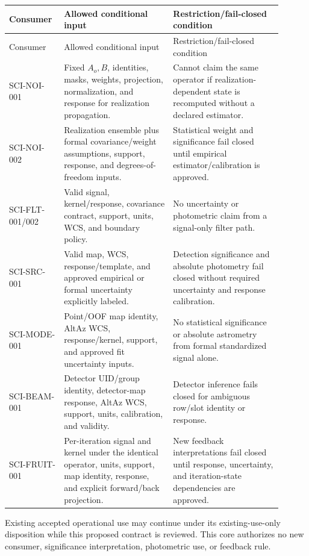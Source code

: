 \documentclass[11pt]{article}
\begin{document}
\begin{longtable}{L{0.16\linewidth}L{0.37\linewidth}L{0.37\linewidth}}
\toprule
Consumer & Allowed conditional input & Restriction/fail-closed condition\\
\midrule
\endfirsthead
\toprule
Consumer & Allowed conditional input & Restriction/fail-closed condition\\
\midrule
\endhead
SCI-NOI-001 & Fixed \(A_o,B\), identities, masks, weights, projection,
normalization, and response for realization propagation. & Cannot claim the
same operator if realization-dependent state is recomputed without a declared
estimator.\\
SCI-NOI-002 & Realization ensemble plus formal covariance/weight assumptions,
support, response, and degrees-of-freedom inputs. & Statistical weight and
significance fail closed until empirical estimator/calibration is approved.\\
SCI-FLT-001/002 & Valid signal, kernel/response, covariance contract, support,
units, WCS, and boundary policy. & No uncertainty or photometric claim from a
signal-only filter path.\\
SCI-SRC-001 & Valid map, WCS, response/template, and approved empirical or
formal uncertainty explicitly labeled. & Detection significance and absolute
photometry fail closed without required uncertainty and response calibration.\\
SCI-MODE-001 & Point/OOF map identity, AltAz WCS, response/kernel, support, and
approved fit uncertainty inputs. & No statistical significance or absolute
astrometry from formal standardized signal alone.\\
SCI-BEAM-001 & Detector UID/group identity, detector-map response, AltAz WCS,
support, units, calibration, and validity. & Detector inference fails closed
for ambiguous row/slot identity or response.\\
SCI-FRUIT-001 & Per-iteration signal and kernel under the identical operator,
units, support, map identity, response, and explicit forward/back projection. &
New feedback interpretations fail closed until response, uncertainty, and
iteration-state dependencies are approved.\\
\bottomrule
\end{longtable}

Existing accepted operational use may continue under its existing-use-only
disposition while this proposed contract is reviewed. This core authorizes no
new consumer, significance interpretation, photometric use, or feedback rule.
\end{document}

